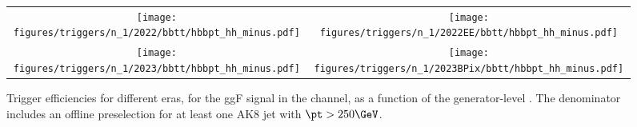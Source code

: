 
    \begin{figure}[H]
        \centering
        \begin{tabular}{cc}
            \texttt{[image: figures/triggers/n\_1/2022/bbtt/hbbpt\_hh\_minus.pdf]} &
            \texttt{[image: figures/triggers/n\_1/2022EE/bbtt/hbbpt\_hh\_minus.pdf]} \\[1ex]
            \texttt{[image: figures/triggers/n\_1/2023/bbtt/hbbpt\_hh\_minus.pdf]} &
            \texttt{[image: figures/triggers/n\_1/2023BPix/bbtt/hbbpt\_hh\_minus.pdf]}
            \label{fig}
        \end{tabular}
\caption{Trigger efficiencies for different eras, for the ggF \HHbbtt signal in the \tauhh channel, as a function of the generator-level \hbb \pt. The denominator includes an offline preselection for at least one AK8 jet with $\pt > 250\GeV$.}
\label{fig:triggers_n-1_bbtt_hh_hbbpt}
\end{figure}
